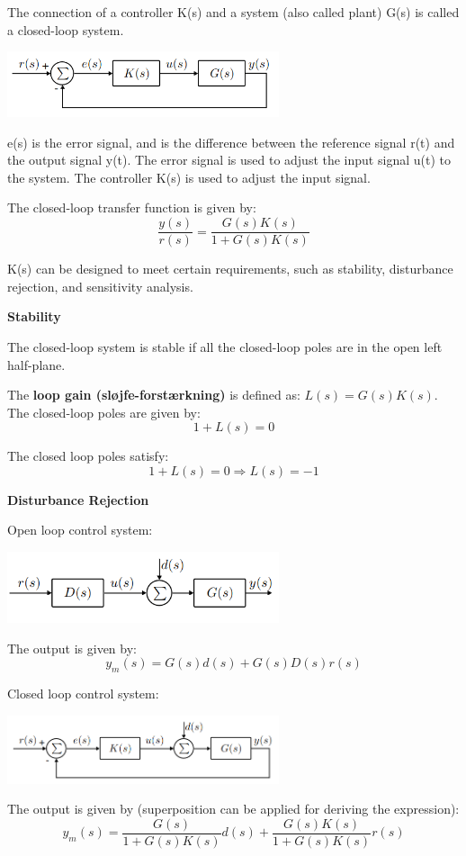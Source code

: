 The connection of a controller K(s) and a system (also called plant) G(s) is called a closed-loop system.
\begin{center}
	\includegraphics[width=0.6\textwidth]{Images/feedbackControl.png}
\end{center}

e(s) is the error signal, and is the difference between the reference signal r(t) and the output signal y(t).
The error signal is used to adjust the input signal u(t) to the system. The controller K(s) is used to adjust the input signal.

The closed-loop transfer function is given by:
$$\frac{y(s)}{r(s)} = \frac{G(s)K(s)}{1+G(s)K(s)}$$

K(s) can be designed to meet certain requirements, such as stability, disturbance rejection, and sensitivity analysis.


\textbf{Stability}

The closed-loop system is stable if all the closed-loop poles are in the
open left half-plane.

The \textbf{loop gain (sløjfe-forstærkning)} is defined as: $L(s) = G(s)K(s)$.
The closed-loop poles are given by:
$$1+L(s) = 0$$

The closed loop poles satisfy:
$$1+L(s) = 0 \Rightarrow L(s) = -1$$

\textbf{Disturbance Rejection}

Open loop control system:
\begin{center}
	\includegraphics[width=0.6\textwidth]{Images/openLoop.png}
\end{center}
The output is given by:
$$y_m(s)=G(s)d(s)+G(s)D(s)r(s)$$


Closed loop control system:
\begin{center}
	\includegraphics[width=0.6\textwidth]{Images/closedLoop.png}
\end{center}
The output is given by (superposition can be applied for deriving the expression):
$$y_m(s) = \frac{G(s)}{1+G(s)K(s)}d(s) + \frac{G(s)K(s)}{1+G(s)K(s)}r(s)$$

